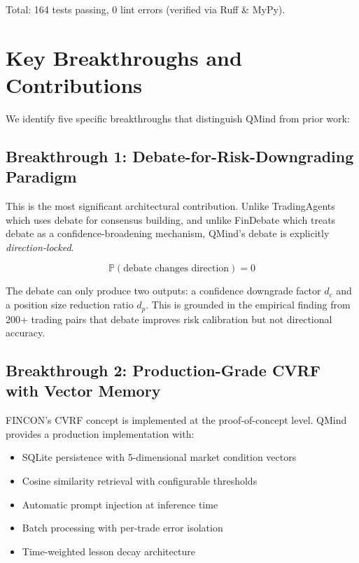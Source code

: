 \documentclass[twocolumn]{article}
\begin{document}
Total: 164 tests passing, 0 lint errors (verified via Ruff \& MyPy).

\section{Key Breakthroughs and Contributions}

We identify five specific breakthroughs that distinguish QMind from prior work:

\subsection{Breakthrough 1: Debate-for-Risk-Downgrading Paradigm}

This is the most significant architectural contribution. Unlike TradingAgents\cite{tradingagents2024} which uses debate for consensus building, and unlike FinDebate\cite{findebate2025} which treats debate as a confidence-broadening mechanism, QMind's debate is explicitly \textit{direction-locked}.

\begin{equation}
\mathbb{P}(\text{debate changes direction}) = 0
\end{equation}

The debate can only produce two outputs: a confidence downgrade factor $d_c$ and a position size reduction ratio $d_p$. This is grounded in the empirical finding from 200+ trading pairs\cite{macroeconomists2026} that debate improves risk calibration but not directional accuracy.

\subsection{Breakthrough 2: Production-Grade CVRF with Vector Memory}

FINCON's CVRF concept\cite{fincon2024} is implemented at the proof-of-concept level. QMind provides a production implementation with:
\begin{itemize}
    \item SQLite persistence with 5-dimensional market condition vectors
    \item Cosine similarity retrieval with configurable thresholds
    \item Automatic prompt injection at inference time
    \item Batch processing with per-trade error isolation
    \item Time-weighted lesson decay architecture
\end{itemize}
\end{document}
